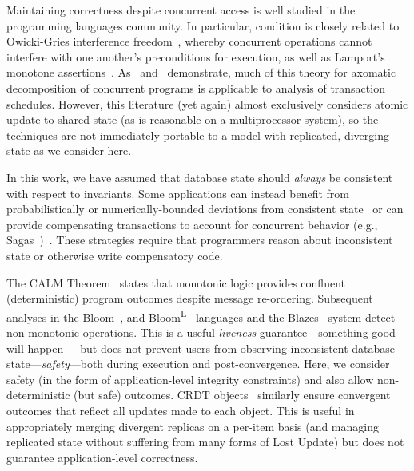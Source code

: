  Maintaining correctness despite concurrent
access is well studied in the programming languages community. In
particular, \iconfluence condition is closely related to Owicki-Gries
interference freedom~\cite{owickigries}, whereby concurrent operations
cannot interfere with one another's preconditions for execution, as
well as Lamport's monotone
assertions~\cite{lamport-safety}. As~\cite{decomp-semantics}
and~\cite{agarwal-consistency} demonstrate, much of this theory for
axomatic decomposition of concurrent programs is applicable to
analysis of transaction schedules. However, this literature (yet
again) almost exclusively considers atomic update to shared state (as
is reasonable on a multiprocessor system), so the techniques are not
immediately portable to a model with replicated, diverging state as we
consider here.

 In this work, we have assumed that
database state should \textit{always} be consistent with respect to
invariants. Some applications can instead benefit from
probabilistically or numerically-bounded deviations from consistent
state~\cite{epsilon-divergence} or can provide compensating
transactions to account for concurrent behavior (e.g.,
Sagas~\cite{sagas})~\cite{ic-survey,ic-survey-two}. These strategies
require that programmers reason about inconsistent state or otherwise
write compensatory code.

 The CALM
Theorem~\cite{ameloot-calm} states that monotonic logic provides
confluent (deterministic) program outcomes despite message
re-ordering. Subsequent analyses in the Bloom~\cite{calm}, and
Bloom\textsuperscript{L}~\cite{blooml} languages and the
Blazes~\cite{blazes} system detect non-monotonic operations. This is a
useful \textit{liveness} guarantee---something good will
happen~\cite{lamport-safety}---but does not prevent users from
observing inconsistent database state---\textit{safety}---both during
execution and post-convergence. Here, we consider safety (in the form
of application-level integrity constraints) and also allow
non-deterministic (but safe) outcomes. CRDT objects~\cite{crdt}
similarly ensure convergent outcomes that reflect all updates made to
each object. This is useful in appropriately merging divergent
replicas on a per-item basis (and managing replicated state without
suffering from many forms of Lost Update) but does not guarantee
application-level correctness.

